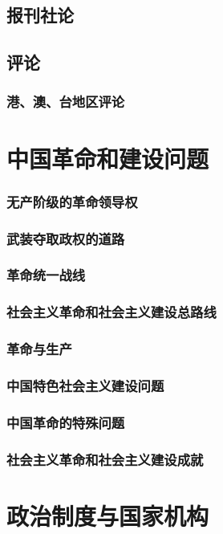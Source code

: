 \documentclass[UTF8]{../RepresentationUniverse}
\begin{document}
    \subsection{报刊社论}
    \subsection{评论}
        \subsubsection{港、澳、台地区评论}

\section{中国革命和建设问题}
    \subsubsection{无产阶级的革命领导权}
    \subsubsection{武装夺取政权的道路}
    \subsubsection{革命统一战线}
    \subsubsection{社会主义革命和社会主义建设总路线}
    \subsubsection{革命与生产}
    \subsubsection{中国特色社会主义建设问题}
    \subsubsection{中国革命的特殊问题}
    \subsubsection{社会主义革命和社会主义建设成就}

\section{政治制度与国家机构}
\end{document}
